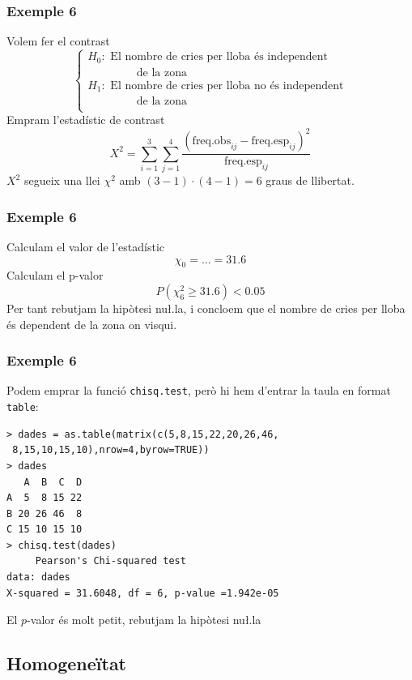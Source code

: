 \documentclass[12pt,t]{beamer}
\renewcommand{\geq}{\geqslant}
\theoremstyle{plain}
\theoremstyle{definition}
\begin{document}
\begin{frame}
\frametitle{Exemple 6}
Volem fer el contrast
$$
\left\{
\begin{array}{ll}
H_0: \mbox{ El nombre de cries per lloba és independent}\\
\qquad\qquad\mbox{ de la zona}\\[1ex]
H_1: \mbox{ El nombre de cries per lloba no és independent}\\
\qquad\qquad\mbox{ de la zona}\\

\end{array}
\right.
$$
Empram l'estadístic de contrast
$$
X^2=\sum_{i=1}^3\sum_{j=1}^4 \frac{(\mbox{freq.obs}_{ij}-\mbox{freq.esp}_{ij})^2}{\mbox{freq.esp}_{ij}}
$$
$X^2$ segueix una llei $\chi^2$ amb $(3-1)\cdot(4-1)=6$ graus de llibertat.
\end{frame}
\begin{frame}
\frametitle{Exemple 6}

Calculam el valor de l'estadístic
$$
\chi_0=\ldots=31.6
$$
Calculam el p-valor
$$
P(\chi^2_6\geq 31.6)<0.05
$$
Per tant rebutjam la hipòtesi nu\l.la, i concloem que el nombre de cries per lloba és dependent de la zona on visqui.
\end{frame}



\begin{frame}[fragile]
\frametitle{Exemple 6}
Podem emprar la funció \texttt{chisq.test}, però hi hem d'entrar la taula en format \texttt{table}:
{\small \begin{verbatim}
> dades = as.table(matrix(c(5,8,15,22,20,26,46,
 8,15,10,15,10),nrow=4,byrow=TRUE))
> dades
   A  B  C  D
A  5  8 15 22
B 20 26 46  8
C 15 10 15 10
> chisq.test(dades)
     Pearson's Chi-squared test
data: dades
X-squared = 31.6048, df = 6, p-value =1.942e-05
\end{verbatim}
}

El $p$-valor és molt petit, rebutjam la hipòtesi nu\l.la
\end{frame}

\subsection{Homogeneïtat}
\end{document}
